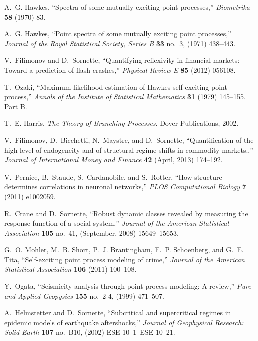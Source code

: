 \documentclass{article}
\newcommand{\tmtextbf}[1]{{\bfseries{#1}}}
\newcommand{\tmtextit}[1]{{\itshape{#1}}}
\begin{document}
\begin{thebibliography}{10}
  A.~G. Hawkes, ``Spectra of some mutually exciting point
  processes,'' \tmtextit{Biometrika} \tmtextbf{58} (1970) 83.
  
  A.~G. Hawkes, ``Point spectra of some mutually exciting
  point processes,'' \tmtextit{Journal of the Royal Statistical Society,
  Series B} \tmtextbf{33} no.~3, (1971) 438--443.
  
  V.~Filimonov and D.~Sornette, ``Quantifying
  reflexivity in financial markets: Toward a prediction of flash crashes,''
  \tmtextit{Physical Review E} \tmtextbf{85} (2012) 056108.
  
  T.~Ozaki, ``Maximum likelihood estimation of Hawkes
  self-exciting point process,'' \tmtextit{Annals of the Institute of
  Statistical Mathematics} \tmtextbf{31} (1979) 145--155. Part B.
  
  T.~E. Harris, \tmtextit{The Theory of Branching
  Processes}. {\newblock}Dover Publications, 2002.
  
  V.~Filimonov, D.~Bicchetti, N.~Maystre, and
  D.~Sornette, ``Quantification of the high level of endogeneity and of
  structural regime shifts in commodity markets.,'' \tmtextit{Journal of
  International Money and Finance} \tmtextbf{42} (April, 2013) 174--192.
  
  V.~Pernice, B.~Staude, S.~Cardanobile, and
  S.~Rotter, ``How structure determines correlations in neuronal networks,''
  \tmtextit{PLOS Computational Biology} \tmtextbf{7} (2011) e1002059.
  
  R.~Crane and D.~Sornette, ``Robust dynamic classes
  revealed by measuring the response function of a social system,''
  \tmtextit{Journal of the American Statistical Association} \tmtextbf{105}
  no.~41, (September, 2008) 15649--15653.
  
  G.~O. Mohler, M.~B. Short, P.~J. Brantingham, F.~P.
  Schoenberg, and G.~E. Tita, ``Self-exciting point process modeling of
  crime,'' \tmtextit{Journal of the American Statistical Association}
  \tmtextbf{106} (2011) 100--108.
  
  Y.~Ogata, ``Seismicity analysis through
  point-process modeling: A review,'' \tmtextit{Pure and Applied Geopysics}
  \tmtextbf{155} no.~2-4, (1999) 471--507.
  
  A.~Helmstetter and D.~Sornette, ``Subcritical and
  supercritical regimes in epidemic models of earthquake aftershocks,''
  \tmtextit{Journal of Geophysical Research: Solid Earth} \tmtextbf{107}
  no.~B10, (2002) ESE 10--1--ESE 10--21.
  

\end{thebibliography}
\end{document}
